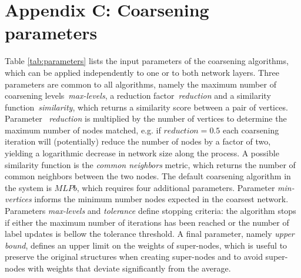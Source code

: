 \documentclass[runningheads]{llncs}
\begin{document}
\section*{Appendix C: Coarsening parameters}

Table \ref{tab:parameters} lists the input parameters of the coarsening algorithms, which can be applied independently to one or to both network layers. 
Three parameters are common to all algorithms, namely the maximum number of coarsening levels~\textit{max-levels}, a reduction factor~\textit{reduction} and a similarity function~\textit{similarity}, which returns a similarity score between a pair of vertices. Parameter ~\textit{reduction} is multiplied by the number of vertices to determine the maximum number of nodes matched, e.g. if $reduction = 0.5$ each coarsening iteration will (potentially) reduce the number of nodes by a factor of two, yielding a logarithmic decrease in network size along the process. 
A possible similarity function is the \emph{common neighbors} metric, which returns the number of common neighbors between the two nodes. The default coarsening algorithm in the system is $MLPb$, which requires four additional parameters. Parameter \textit{min-vertices} informs the minimum number nodes expected in the coarsest network. Parameters \textit{max-levels} and  \textit{tolerance} define stopping criteria: the algorithm stops if either the maximum number of iterations has been reached or the number of label updates is bellow the tolerance threshold. 
A final parameter, namely \textit{upper bound}, defines an upper limit on the weights of super-nodes, which is useful to preserve the original structures when creating super-nodes and to avoid super-nodes with weights that deviate significantly from the average.
\end{document}

